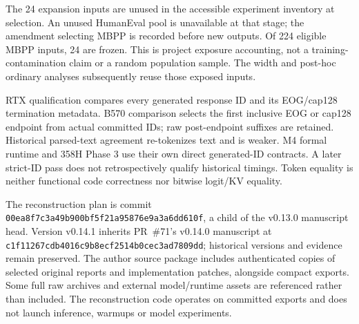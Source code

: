 The 24 expansion inputs are unused in the accessible experiment inventory at selection. An unused HumanEval pool is unavailable at that stage; the amendment selecting MBPP is recorded before new outputs. Of 224 eligible MBPP inputs, 24 are frozen. This is project exposure accounting, not a training-contamination claim or a random population sample. The width and post-hoc ordinary analyses subsequently reuse those exposed inputs.

RTX qualification compares every generated response ID and its EOG/cap128 termination metadata. B570 comparison selects the first inclusive EOG or cap128 endpoint from actual committed IDs; raw post-endpoint suffixes are retained. Historical parsed-text agreement re-tokenizes text and is weaker. M4 formal runtime and 358H Phase 3 use their own direct generated-ID contracts. A later strict-ID pass does not retrospectively qualify historical timings. Token equality is neither functional code correctness nor bitwise logit/KV equality.

The reconstruction plan is commit \nolinkurl{00ea8f7c3a49b900bf5f21a95876e9a3a6dd610f}, a child of the v0.13.0 manuscript head. Version v0.14.1 inherits PR~\#71's v0.14.0 manuscript at \nolinkurl{c1f11267cdb4016c9b8ecf2514b0cec3ad7809dd}; historical versions and evidence remain preserved. The author source package includes authenticated copies of selected original reports and implementation patches, alongside compact exports. Some full raw archives and external model/runtime assets are referenced rather than included. The reconstruction code operates on committed exports and does not launch inference, warmups or model experiments.
